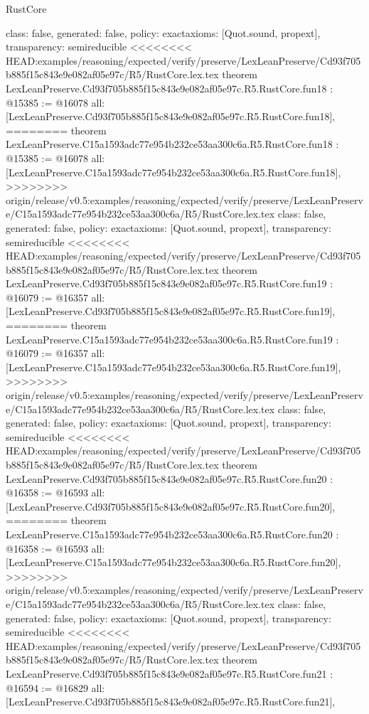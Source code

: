 \begin{lexlean}{RustCore}
\begin{coremodule}
{\begin{coremodule}
{{{{{{{{{{{{{{{{{{{{{  class: false,
  generated: false,
  policy: exact{axioms: [Quot.sound, propext]},
  transparency: semireducible
}
<<<<<<<< HEAD:examples/reasoning/expected/verify/preserve/LexLeanPreserve/Cd93f705b885f15c843e9e082af05e97c/R5/RustCore.lex.tex
theorem LexLeanPreserve.Cd93f705b885f15c843e9e082af05e97c.R5.RustCore.fun18 : @15385 := @16078 {
  all: [LexLeanPreserve.Cd93f705b885f15c843e9e082af05e97c.R5.RustCore.fun18],
========
theorem LexLeanPreserve.C15a1593adc77e954b232ce53aa300c6a.R5.RustCore.fun18 : @15385 := @16078 {
  all: [LexLeanPreserve.C15a1593adc77e954b232ce53aa300c6a.R5.RustCore.fun18],
>>>>>>>> origin/release/v0.5:examples/reasoning/expected/verify/preserve/LexLeanPreserve/C15a1593adc77e954b232ce53aa300c6a/R5/RustCore.lex.tex
  class: false,
  generated: false,
  policy: exact{axioms: [Quot.sound, propext]},
  transparency: semireducible
}
<<<<<<<< HEAD:examples/reasoning/expected/verify/preserve/LexLeanPreserve/Cd93f705b885f15c843e9e082af05e97c/R5/RustCore.lex.tex
theorem LexLeanPreserve.Cd93f705b885f15c843e9e082af05e97c.R5.RustCore.fun19 : @16079 := @16357 {
  all: [LexLeanPreserve.Cd93f705b885f15c843e9e082af05e97c.R5.RustCore.fun19],
========
theorem LexLeanPreserve.C15a1593adc77e954b232ce53aa300c6a.R5.RustCore.fun19 : @16079 := @16357 {
  all: [LexLeanPreserve.C15a1593adc77e954b232ce53aa300c6a.R5.RustCore.fun19],
>>>>>>>> origin/release/v0.5:examples/reasoning/expected/verify/preserve/LexLeanPreserve/C15a1593adc77e954b232ce53aa300c6a/R5/RustCore.lex.tex
  class: false,
  generated: false,
  policy: exact{axioms: [Quot.sound, propext]},
  transparency: semireducible
}
<<<<<<<< HEAD:examples/reasoning/expected/verify/preserve/LexLeanPreserve/Cd93f705b885f15c843e9e082af05e97c/R5/RustCore.lex.tex
theorem LexLeanPreserve.Cd93f705b885f15c843e9e082af05e97c.R5.RustCore.fun20 : @16358 := @16593 {
  all: [LexLeanPreserve.Cd93f705b885f15c843e9e082af05e97c.R5.RustCore.fun20],
========
theorem LexLeanPreserve.C15a1593adc77e954b232ce53aa300c6a.R5.RustCore.fun20 : @16358 := @16593 {
  all: [LexLeanPreserve.C15a1593adc77e954b232ce53aa300c6a.R5.RustCore.fun20],
>>>>>>>> origin/release/v0.5:examples/reasoning/expected/verify/preserve/LexLeanPreserve/C15a1593adc77e954b232ce53aa300c6a/R5/RustCore.lex.tex
  class: false,
  generated: false,
  policy: exact{axioms: [Quot.sound, propext]},
  transparency: semireducible
}
<<<<<<<< HEAD:examples/reasoning/expected/verify/preserve/LexLeanPreserve/Cd93f705b885f15c843e9e082af05e97c/R5/RustCore.lex.tex
theorem LexLeanPreserve.Cd93f705b885f15c843e9e082af05e97c.R5.RustCore.fun21 : @16594 := @16829 {
  all: [LexLeanPreserve.Cd93f705b885f15c843e9e082af05e97c.R5.RustCore.fun21],
}}}}}}}}}}}}}}}}}}}}}}}}
\end{coremodule}}
\end{coremodule}
\end{lexlean}
